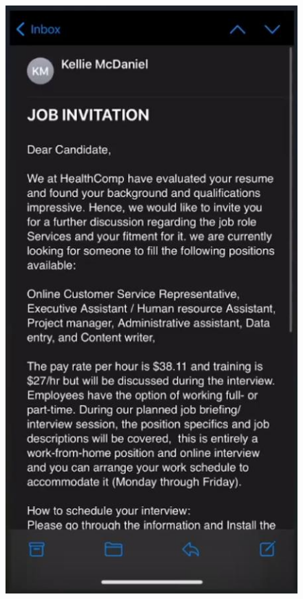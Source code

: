 \begin{fullwidth}
\begin{figure}[H] %
    \centering
    \includegraphics[scale=.5]{assets/full-interview-email-1.png}

\end{figure}
\end{fullwidth}
